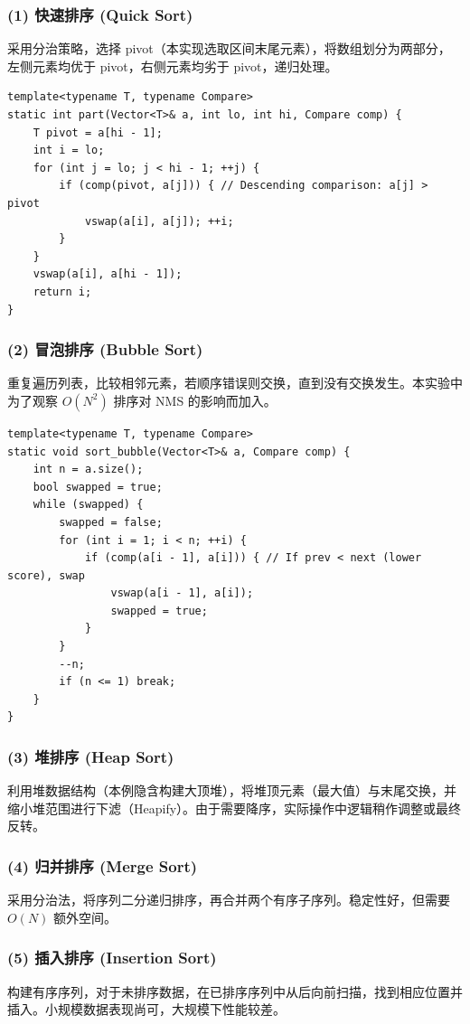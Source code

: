 \documentclass[a4paper,12pt]{ctexart}
\begin{document}
\subsubsection{(1) 快速排序 (Quick Sort)}
采用分治策略，选择 pivot（本实现选取区间末尾元素），将数组划分为两部分，左侧元素均优于 pivot，右侧元素均劣于 pivot，递归处理。
\begin{lstlisting}
template<typename T, typename Compare>
static int part(Vector<T>& a, int lo, int hi, Compare comp) {
    T pivot = a[hi - 1];
    int i = lo;
    for (int j = lo; j < hi - 1; ++j) {
        if (comp(pivot, a[j])) { // Descending comparison: a[j] > pivot
            vswap(a[i], a[j]); ++i; 
        }
    }
    vswap(a[i], a[hi - 1]);
    return i;
}
\end{lstlisting}

\subsubsection{(2) 冒泡排序 (Bubble Sort)}
重复遍历列表，比较相邻元素，若顺序错误则交换，直到没有交换发生。本实验中为了观察 $O(N^2)$ 排序对 NMS 的影响而加入。
\begin{lstlisting}
template<typename T, typename Compare>
static void sort_bubble(Vector<T>& a, Compare comp) {
    int n = a.size();
    bool swapped = true;
    while (swapped) {
        swapped = false;
        for (int i = 1; i < n; ++i) {
            if (comp(a[i - 1], a[i])) { // If prev < next (lower score), swap
                vswap(a[i - 1], a[i]); 
                swapped = true; 
            }
        }
        --n; 
        if (n <= 1) break;
    }
}
\end{lstlisting}

\subsubsection{(3) 堆排序 (Heap Sort)}
利用堆数据结构（本例隐含构建大顶堆），将堆顶元素（最大值）与末尾交换，并缩小堆范围进行下滤（Heapify）。由于需要降序，实际操作中逻辑稍作调整或最终反转。

\subsubsection{(4) 归并排序 (Merge Sort)}
采用分治法，将序列二分递归排序，再合并两个有序子序列。稳定性好，但需要 $O(N)$ 额外空间。

\subsubsection{(5) 插入排序 (Insertion Sort)}
构建有序序列，对于未排序数据，在已排序序列中从后向前扫描，找到相应位置并插入。小规模数据表现尚可，大规模下性能较差。
\end{document}
